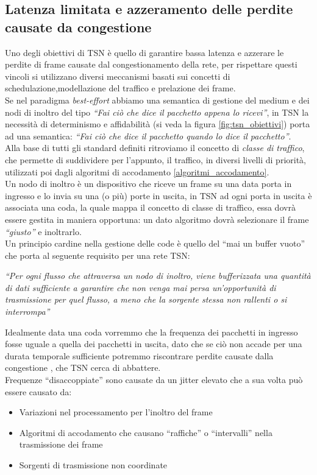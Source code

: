 \documentclass[12pt,a4paper,twoside]{book}
\begin{document}
\begin{onehalfspace}
\section{Latenza limitata e azzeramento delle perdite causate da congestione}
Uno degli obiettivi di TSN è quello di garantire bassa latenza e azzerare le perdite di frame causate dal congestionamento della rete, per rispettare questi vincoli si utilizzano diversi meccanismi basati sui concetti di schedulazione,modellazione del traffico e prelazione dei frame. 
\\
Se nel paradigma \textit{best-effort} abbiamo una semantica di gestione del medium e dei nodi di inoltro del tipo \emph{“Fai ciò che dice il pacchetto appena lo ricevi”}, \cite{intro_to_TSN} in TSN la necessità di determinismo e affidabilità (si veda la figura \ref{fig:tsn_obiettivi}) porta ad una semantica: \emph{“Fai ciò che dice il pacchetto quando lo dice il pacchetto”}.
\\
Alla base di tutti gli standard definiti ritroviamo il concetto di \textit{classe di traffico}, che permette di suddividere per l'appunto, il traffico, in diversi livelli di priorità, utilizzati poi dagli algoritmi di accodamento \ref{algoritmi_accodamento}.
\\
Un nodo di inoltro è un dispositivo che riceve un frame su una data porta in ingresso e lo invia su una (o più) porte in uscita, in TSN ad ogni porta in uscita è associata una coda, la quale mappa il concetto di classe di traffico, essa dovrà essere gestita in maniera opportuna: un dato algoritmo dovrà selezionare il frame  \textit{“giusto”} e inoltrarlo.
\\
Un principio cardine nella gestione delle code è quello del “mai un buffer vuoto” \cite{intro_to_TSN} che porta al seguente requisito per una rete TSN: 
\begin{center}
    \emph{“Per ogni flusso che attraversa un nodo di inoltro, viene bufferizzata una quantità di dati sufficiente a garantire che non venga mai persa un'opportunità di trasmissione per quel flusso, a meno che la sorgente stessa non rallenti o si interrompa”}
\end{center}
Idealmente data una coda vorremmo che la frequenza dei pacchetti in ingresso fosse uguale a quella dei pacchetti in uscita, dato che se ciò non accade per una durata temporale sufficiente potremmo riscontrare perdite causate dalla congestione \cite{congestion_avoidance_and_control}, che TSN cerca di abbattere. 
\\ 
Frequenze “disaccoppiate” sono causate da un jitter elevato che a sua volta può essere causato da:
\begin{itemize}
    \item Variazioni nel processamento per l'inoltro del frame 
    \item Algoritmi di accodamento che causano “raffiche” o “intervalli” nella trasmissione dei frame
    \item Sorgenti di trasmissione non coordinate
\end{itemize}


\end{onehalfspace}
\end{document}
